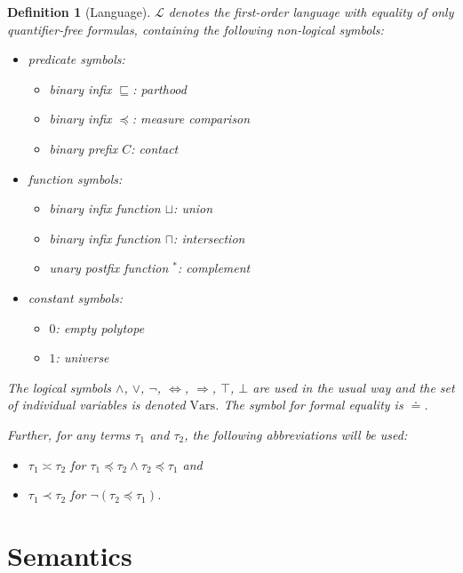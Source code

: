 \documentclass{article}
\newtheorem*{definition}{Definition}
\newcommand{\lang}{\mathcal{L}}
\newcommand{\Vars}{\text{Vars}}
\newcommand{\lcup}{\sqcup}
\newcommand{\lcap}{\sqcap}
\newcommand{\lstar}{^*}
\newcommand{\lpart}{\sqsubseteq}
\newcommand{\lparteq}{\doteq}
\newcommand{\lcont}{C}
\newcommand{\lmeasure}{\preceq}
\newcommand{\lmeasures}{\prec}
\newcommand{\lmeasureeq}{\asymp}
\begin{document}
\begin{definition}[Language]
  $\lang$ denotes the first-order language with equality of only quantifier-free formulas, containing the following non-logical symbols:
\begin{itemize}
  \item predicate symbols:
  \begin{itemize}
  \item binary infix $\lpart$: parthood
  \item binary infix $\lmeasure$: measure comparison
  \item binary prefix $\lcont$: contact
  \end{itemize}
  \item function symbols:
  \begin{itemize}
  \item binary infix function $\lcup$: union
  \item binary infix function $\lcap$: intersection
  \item unary postfix function $\lstar$: complement
  \end{itemize}
  \item constant symbols:
  \begin{itemize}
  \item $0$: empty polytope
  \item $1$: universe
  \end{itemize}
\end{itemize}

The logical symbols $\land$, $\lor$, $\lnot$, $\Leftrightarrow$, $\Rightarrow$, $\top$, $\bot$ are used in the usual way and the set of individual variables is denoted $\Vars$. The symbol for formal equality is $\lparteq$.

Further, for any terms $\tau_1$ and $\tau_2$, the following abbreviations will be used:
\begin{itemize}
\item $\tau_1 \lmeasureeq \tau_2$ for $\tau_1 \lmeasure \tau_2 \land \tau_2 \lmeasure \tau_1$ and
\item $\tau_1 \lmeasures \tau_2$ for $\lnot (\tau_2 \lmeasure \tau_1)$.
\end{itemize}

\end{definition}

\section{Semantics}
\end{document}
